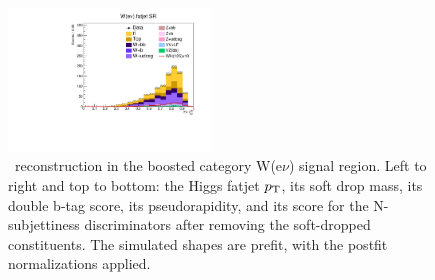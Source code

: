 \begin{figure}[tbp]
\begin{center}
    \includegraphics[width=0.48\textwidth]{figures/wlnhbb2016/boosted/WenWHFJSR_fj1Tau32SD.pdf}
    \caption{\HBB\ reconstruction in the boosted category W(e$\nu$) signal region.
    Left to right and top to bottom: the Higgs fatjet $p_{\mathrm{T}}$, its soft drop mass, its
    double b-tag score, its pseudorapidity, and its score for the N-subjettiness discriminators
    after removing the soft-dropped constituents.
    The simulated shapes are prefit, with the postfit normalizations applied.}
    \label{fig:boost_WenSR_Hbb}
  \end{center}
\end{figure}
\clearpage

